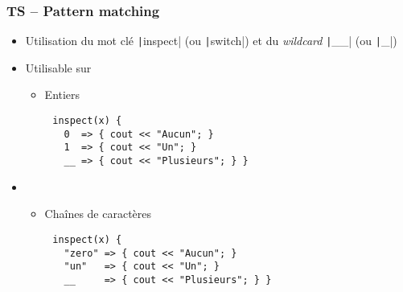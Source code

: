 \documentclass[C++.tex]{subfiles}
\begin{document}
\begin{frame}[fragile]
	\frametitle{TS -- Pattern matching}
	\begin{itemize}
		\item Utilisation du mot clé \texttt|inspect| (ou \texttt|switch|) et du \textit{wildcard} \texttt|__| (ou \texttt|_|)
		\item Utilisable sur
		\begin{itemize}
			\item Entiers

		\end{itemize}
	\end{itemize}

	\begin{verbatim}
		inspect(x) {
		  0  => { cout << "Aucun"; }
		  1  => { cout << "Un"; }
		  __ => { cout << "Plusieurs"; } }
	\end{verbatim}

	\begin{itemize}
		\item[] 
		\begin{itemize}
			\item Chaînes de caractères
		\end{itemize}
	\end{itemize}

	\begin{verbatim}
		inspect(x) {
		  "zero" => { cout << "Aucun"; }
		  "un"   => { cout << "Un"; }
		  __     => { cout << "Plusieurs"; } }
	\end{verbatim}
\end{frame}
\end{document}
